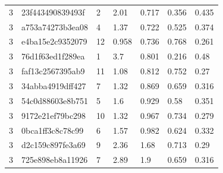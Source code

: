 \begin{tabular}{lllllll}
3 & 23f443490839493f & 2 & 2.01 & 0.717 & 0.356 & 0.435 \\
3 & a753a74273b3ea08 & 4 & 1.37 & 0.722 & 0.525 & 0.374 \\
3 & e4ba15e2c9352079 & 12 & 0.958 & 0.736 & 0.768 & 0.261 \\
3 & 76d1f63ed1f289ea & 1 & 3.7 & 0.801 & 0.216 & 0.48 \\
3 & faf13c2567395ab9 & 11 & 1.08 & 0.812 & 0.752 & 0.27 \\
3 & 34abba4919dff427 & 7 & 1.32 & 0.869 & 0.659 & 0.316 \\
3 & 54c0d88603e8b751 & 5 & 1.6 & 0.929 & 0.58 & 0.351 \\
3 & 9172e21ef79bc298 & 10 & 1.32 & 0.967 & 0.734 & 0.279 \\
3 & 0bca1ff3c8c78c99 & 6 & 1.57 & 0.982 & 0.624 & 0.332 \\
3 & d2c159c897fe3a69 & 9 & 2.36 & 1.68 & 0.713 & 0.29 \\
3 & 725e898eb8a11926 & 7 & 2.89 & 1.9 & 0.659 & 0.316 \\
\bottomrule
\end{tabular}